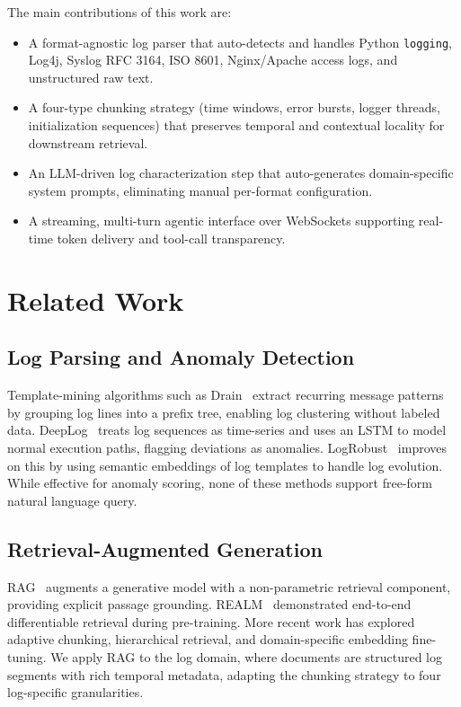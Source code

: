 \documentclass[runningheads]{llncs}
\begin{document}
The main contributions of this work are:
\begin{itemize}
  \item A format-agnostic log parser that auto-detects and handles Python
        \texttt{logging}, Log4j, Syslog RFC 3164, ISO 8601, Nginx/Apache
        access logs, and unstructured raw text.
  \item A four-type chunking strategy (time windows, error bursts, logger
        threads, initialization sequences) that preserves temporal and
        contextual locality for downstream retrieval.
  \item An LLM-driven log characterization step that auto-generates
        domain-specific system prompts, eliminating manual per-format
        configuration.
  \item A streaming, multi-turn agentic interface over WebSockets supporting
        real-time token delivery and tool-call transparency.
\end{itemize}

\section{Related Work}
\label{sec:related}

\subsection{Log Parsing and Anomaly Detection}

Template-mining algorithms such as Drain~\cite{he2017drain} extract recurring
message patterns by grouping log lines into a prefix tree, enabling log
clustering without labeled data. DeepLog~\cite{du2017deeplog} treats log
sequences as time-series and uses an LSTM to model normal execution paths,
flagging deviations as anomalies. LogRobust~\cite{zhang2019robust} improves
on this by using semantic embeddings of log templates to handle log evolution.
While effective for anomaly scoring, none of these methods support free-form
natural language query.

\subsection{Retrieval-Augmented Generation}

RAG~\cite{lewis2020rag} augments a generative model with a non-parametric
retrieval component, providing explicit passage grounding. REALM~\cite{
guu2020realm} demonstrated end-to-end differentiable retrieval during
pre-training. More recent work has explored adaptive chunking, hierarchical
retrieval, and domain-specific embedding fine-tuning. We apply RAG to the log
domain, where documents are structured log segments with rich temporal
metadata, adapting the chunking strategy to four log-specific granularities.
\end{document}
